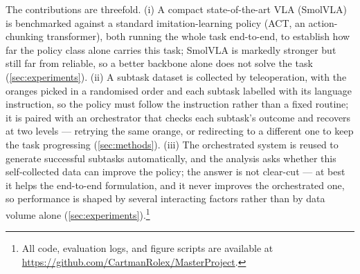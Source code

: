 The contributions are threefold. (i) A compact state-of-the-art VLA (SmolVLA) is benchmarked against a standard imitation-learning policy (ACT, an action-chunking transformer), both running the whole task end-to-end, to establish how far the policy class alone carries this task; SmolVLA is markedly stronger but still far from reliable, so a better backbone alone does not solve the task (\cref{sec:experiments}). (ii) A subtask dataset is collected by teleoperation, with the oranges picked in a randomised order and each subtask labelled with its language instruction, so the policy must follow the instruction rather than a fixed routine; it is paired with an orchestrator that checks each subtask's outcome and recovers at two levels --- retrying the same orange, or redirecting to a different one to keep the task progressing (\cref{sec:methods}). (iii) The orchestrated system is reused to generate successful subtasks automatically, and the analysis asks whether this self-collected data can improve the policy; the answer is not clear-cut --- at best it helps the end-to-end formulation, and it never improves the orchestrated one, so performance is shaped by several interacting factors rather than by data volume alone (\cref{sec:experiments}).\footnote{All code, evaluation logs, and figure scripts are available at \url{https://github.com/CartmanRolex/MasterProject}.}
